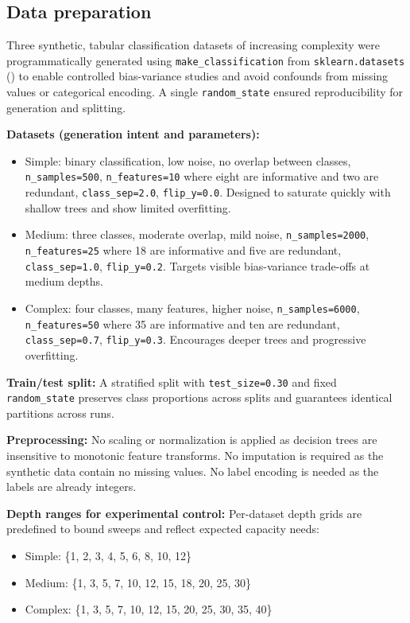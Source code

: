 \documentclass[conference]{IEEEtran}
\begin{document}
\subsection{Data preparation}
Three synthetic, tabular classification datasets of increasing complexity were programmatically generated using 
\texttt{make\_classification} from \texttt{sklearn.datasets} (\cite{scikit-learn}) to enable controlled bias-variance studies and
 avoid confounds from missing values or categorical encoding. A single \texttt{random\_state} ensured reproducibility for generation and splitting.

\textbf{Datasets (generation intent and parameters):}
\begin{itemize}
  \item Simple: binary classification, low noise, no overlap between classes, \texttt{n\_samples=500}, \texttt{n\_features=10} where eight are informative and two are redundant, \texttt{class\_sep=2.0}, \texttt{flip\_y=0.0}. Designed to saturate quickly with shallow trees and show limited overfitting.
  \item Medium: three classes, moderate overlap, mild noise, \texttt{n\_samples=2000}, \texttt{n\_features=25} where 18 are informative and five are redundant, \texttt{class\_sep=1.0}, \texttt{flip\_y=0.2}. Targets visible bias-variance trade-offs at medium depths.
  \item Complex: four classes, many features, higher noise, \texttt{n\_samples=6000}, \texttt{n\_features=50} where 35 are informative and ten are redundant, \texttt{class\_sep=0.7}, \texttt{flip\_y=0.3}. Encourages deeper trees and progressive overfitting.
\end{itemize}

\textbf{Train/test split:} A stratified split with \texttt{test\_size=0.30} and fixed \texttt{random\_state} preserves 
class proportions across splits and guarantees identical partitions across runs.


\textbf{Preprocessing:} No scaling or normalization is applied as decision trees are insensitive to monotonic feature transforms. No imputation is
 required as the synthetic data contain no missing values. No label encoding is needed as the labels are already integers.

\textbf{Depth ranges for experimental control:} Per-dataset depth grids are predefined to bound sweeps and reflect expected capacity needs:
\begin{itemize}
  \item Simple: \{1, 2, 3, 4, 5, 6, 8, 10, 12\}
  \item Medium: \{1, 3, 5, 7, 10, 12, 15, 18, 20, 25, 30\}
  \item Complex: \{1, 3, 5, 7, 10, 12, 15, 20, 25, 30, 35, 40\}
\end{itemize}
\end{document}
